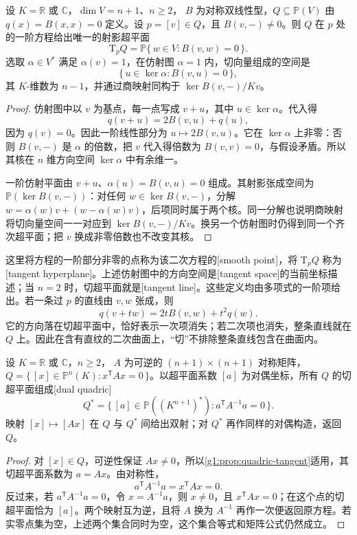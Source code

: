 \begin{proposition}\label{g1:prop:quadric-tangent}
	设 \(K=\mathbb R\) 或 \(\mathbb C\)，\(\dim V=n+1\)、\(n\ge2\)， \(B\) 为对称双线性型，\(Q\subseteq\mathbb P(V)\) 由 \(q(x)=B(x,x)=0\) 定义。设 \(p=[v]\in Q\)，且 \(B(v,-)\ne0\)。则 \(Q\) 在 \(p\) 处的一阶方程给出唯一的射影超平面
	\[
		\mathrm{T}_pQ=\mathbb P\{\,w\in V:B(v,w)=0\,\}.
	\]
	选取 \(\alpha\in V^*\) 满足 \(\alpha(v)=1\)，在仿射图 \(\alpha=1\) 内，切向量组成的空间是
	\[
		\{\,u\in\ker\alpha:B(v,u)=0\,\},
	\]
	其 \(K\)-维数为 \(n-1\)，并通过商映射同构于 \(\ker B(v,-)/Kv\)。
\end{proposition}
\begin{proof}
	仿射图中以 \(v\) 为基点，每一点写成 \(v+u\)，其中 \(u\in\ker\alpha\)。代入得
	\[
		q(v+u)=2B(v,u)+q(u),
	\]
	因为 \(q(v)=0\)。因此一阶线性部分为 \(u\mapsto2B(v,u)\)。它在 \(\ker\alpha\) 上非零：否则 \(B(v,-)\) 是 \(\alpha\) 的倍数，把 \(v\) 代入得倍数为 \(B(v,v)=0\)，与假设矛盾。所以其核在 \(n\) 维方向空间 \(\ker\alpha\) 中有余维一。

	一阶仿射平面由 \(v+u\)、\(\alpha(u)=B(v,u)=0\) 组成。其射影张成空间为 \(\mathbb P(\ker B(v,-))\)：对任何 \(w\in\ker B(v,-)\)，分解 \(w=\alpha(w)v+(w-\alpha(w)v)\)，后项同时属于两个核。同一分解也说明商映射将切向量空间一一对应到 \(\ker B(v,-)/Kv\)。换另一个仿射图时仍得到同一个齐次超平面；把 \(v\) 换成非零倍数也不改变其核。
\end{proof}

这里将方程的一阶部分非零的点称为该二次方程的[smooth point]，将 \(\mathrm{T}_pQ\) 称为[tangent hyperplane]。上述仿射图中的方向空间是[tangent space]的当前坐标描述；当 \(n=2\) 时，切超平面就是[tangent line]。这些定义均由多项式的一阶项给出。若一条过 \(p\) 的直线由 \(v,w\) 张成，则
\[
	q(v+tw)=2tB(v,w)+t^2q(w).
\]
它的方向落在切超平面中，恰好表示一次项消失；若二次项也消失，整条直线就在 \(Q\) 上。因此在含有直纹的二次曲面上，“切”不排除整条直线包含在曲面内。

\begin{theorem}\label{g1:thm:dual-quadric}
	设 \(K=\mathbb R\) 或 \(\mathbb C\)，\(n\ge2\)， \(A\) 为可逆的 \((n+1)\times(n+1)\) 对称矩阵， \(Q=\{\,[x]\in\mathbb P^n(K):x^{\mathsf T}Ax=0\,\}\)。以超平面系数 \([a]\) 为对偶坐标，所有 \(Q\) 的切超平面组成[dual quadric]
	\[
		Q^*=\{\,[a]\in\mathbb P((K^{n+1})^*):a^{\mathsf T}A^{-1}a=0\,\}.
	\]
	映射 \([x]\mapsto[Ax]\) 在 \(Q\) 与 \(Q^*\) 间给出双射；对 \(Q^*\) 再作同样的对偶构造，返回 \(Q\)。
\end{theorem}
\begin{proof}
	对 \([x]\in Q\)，可逆性保证 \(Ax\ne0\)，所以\cref{g1:prop:quadric-tangent}适用，其切超平面系数为 \(a=Ax\)。由对称性，
	\[
		a^{\mathsf T}A^{-1}a=x^{\mathsf T}Ax=0.
	\]
	反过来，若 \(a^{\mathsf T}A^{-1}a=0\)，令 \(x=A^{-1}a\)，则 \(x\ne0\)，且 \(x^{\mathsf T}Ax=0\)；在这个点的切超平面恰为 \([a]\)。两个映射互为逆，且将 \(A\) 换为 \(A^{-1}\) 再作一次便返回原方程。若实零点集为空，上述两个集合同时为空，这个集合等式和矩阵公式仍然成立。
\end{proof}

